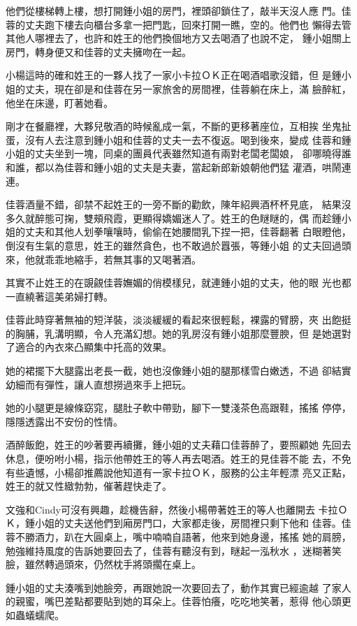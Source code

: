 他們從樓梯轉上樓，想打開鍾小姐的房門，裡頭卻鎖住了，敲半天沒人應
門。佳蓉的丈夫跑下樓去向櫃台多拿一把門匙，回來打開一瞧，空的。他們也
懶得去管其他人哪裡去了，也許和姓王的他們換個地方又去喝酒了也說不定，
鍾小姐關上房門，轉身便又和佳蓉的丈夫擁吻在一起。

小楊這時的確和姓王的一夥人找了一家小卡拉ＯＫ正在喝酒唱歌沒錯，但
是鍾小姐的丈夫，現在卻是和佳蓉在另一家旅舍的房間裡，佳蓉躺在床上，滿
臉醉紅，他坐在床邊，盯著她看。

剛才在餐廳裡，大夥兒敬酒的時候亂成一氣，不斷的更移著座位，互相挨
坐鬼扯蛋，沒有人去注意到鍾小姐和佳蓉的丈夫一去不復返。喝到後來，變成
佳蓉和鍾小姐的丈夫坐到一塊，同桌的團員代表雖然知道有兩對老闆老闆娘，
卻哪曉得誰和誰，都以為佳蓉和鍾小姐的丈夫是夫妻，當起新郎新娘朝他們猛
灌酒，哄鬧連連。

佳蓉酒量不錯，卻禁不起姓王的一旁不斷的勸飲，陳年紹興酒杯杯見底，
結果沒多久就醉態可掬，雙頰飛霞，更顯得嬌媚迷人了。姓王的色瞇瞇的，偶
而趁鍾小姐的丈夫和其他人划拳嚷嚷時，偷偷在她腰間乳下捏一把，佳蓉翻著
白眼瞪他，倒沒有生氣的意思，姓王的雖然貪色，也不敢過於囂張，等鍾小姐
的丈夫回過頭來，他就乖乖地縮手，若無其事的又喝著酒。

其實不止姓王的在覬覦佳蓉嫵媚的俏模樣兒，就連鍾小姐的丈夫，他的眼
光也都一直繞著這美弟婦打轉。

佳蓉此時穿著無袖的短洋裝，淡淡緩緩的看起來很輕鬆，裸露的臂膀，夾
出飽挺的胸脯，乳溝明顯，令人充滿幻想。她的乳房沒有鍾小姐那麼豐腴，但
是她選對了適合的內衣來凸顯集中托高的效果。

她的裙擺下大腿露出老長一截，她也沒像鍾小姐的腿那樣雪白嫩透，不過
卻結實幼細而有彈性，讓人直想撈過來手上把玩。

她的小腿更是線條窈窕，腿肚子軟中帶勁，腳下一雙淺茶色高跟鞋，搖搖
停停，隱隱透露出不安份的性情。

酒醉飯飽，姓王的吵著要再續攤，鍾小姐的丈夫藉口佳蓉醉了，要照顧她
先回去休息，便吩咐小楊，指示他帶姓王的等人再去喝酒。姓王的見佳蓉不能
去，不免有些遺憾，小楊卻推薦說他知道有一家卡拉ＯＫ，服務的公主年輕漂
亮又正點，姓王的就又性緻勃勃，催著趕快走了。

文強和Cindy可沒有興趣，趁機告辭，然後小楊帶著姓王的等人也離開去
卡拉ＯＫ，鍾小姐的丈夫送他們到廂房門口，大家都走後，房間裡只剩下他和
佳蓉。佳蓉不勝酒力，趴在大圓桌上，嘴中喃喃自語著，他來到她身邊，搖搖
她的肩膀，勉強維持風度的告訴她要回去了，佳蓉有聽沒有到，瞇起一泓秋水
，迷糊著笑臉，雖然轉過頭來，仍然枕手將頭擱在桌上。

鍾小姐的丈夫湊嘴到她臉旁，再跟她說一次要回去了，動作其實已經逾越
了家人的親蜜，嘴巴差點都要貼到她的耳朵上。佳蓉怕癢，吃吃地笑著，惹得
他心頭更如蟲蟻蠕爬。

